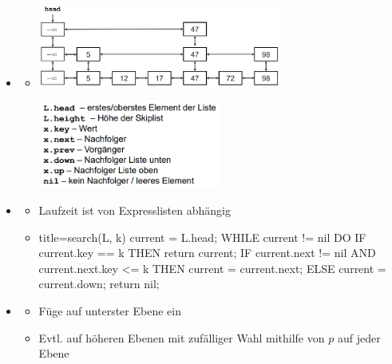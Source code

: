 \documentclass[
    12pt,
    a4paper,
    ngerman,
    color=3b,%
    marginpar=false,
    colorback=false,
    leqno,
]{tudaexercise}
\begin{document}
\begin{itemize}
        \item {}
            \begin{itemize}
                \item[]
                    \begin{minipage}{0.5\textwidth}
                        \includegraphics[width=8cm]{pictures/skiplistImplement1.PNG}
                    \end{minipage}
                    \begin{minipage}{0.4\textwidth}
                        \includegraphics[width=6cm]{pictures/skiplistImplement2.PNG}
                    \end{minipage}
            \end{itemize}
\clearpage
        \item {}
            \begin{itemize}
                \item Laufzeit ist von Expresslisten abhängig
                \item[]
                    \begin{ccode}[autogobble]{title={search(L, k)}}
                    current = L.head;
                    WHILE current != nil DO
                        IF current.key == k THEN 
                            return current;
                        IF current.next != nil AND current.next.key <= k THEN
                            current = current.next;
                        ELSE
                            current = current.down;
                    return nil;
                    \end{ccode}
            \end{itemize}

        \item {}
            \begin{itemize}
                \item Füge auf unterster Ebene ein
                \item Evtl. auf höheren Ebenen mit zufälliger Wahl mithilfe von $p$ auf jeder Ebene
            \end{itemize}


\end{itemize}
\end{document}
